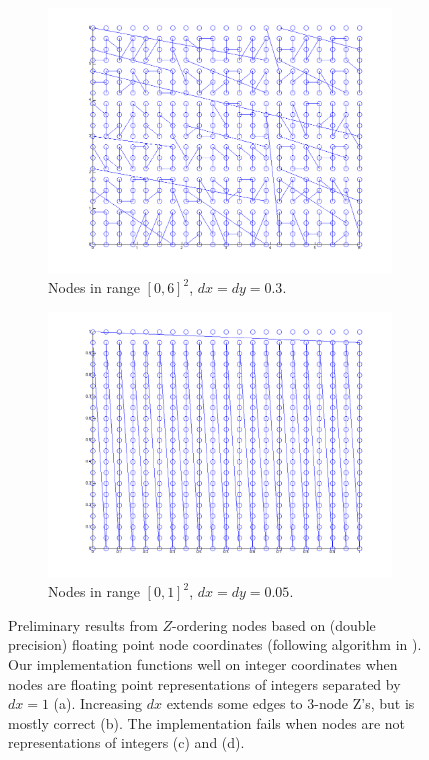 \documentclass{report}
\begin{document}
\begin{figure}
\begin{subfigure}[t]{0.5\textwidth}
\includegraphics[width=\textwidth]{stencils_content/scale3em1.png}
\caption{Nodes in range $[0,6]^2$, $dx = dy = 0.3$.  }
\label{fig:connor_fails}
\end{subfigure}
\begin{subfigure}[t]{0.5\textwidth}
\includegraphics[width=\textwidth]{stencils_content/range0_1.png}
\caption{Nodes in range $[0,1]^2$, $dx = dy = 0.05$. }
\label{fig:connor_fails2}
\end{subfigure}
\caption{Preliminary results from $Z$-ordering nodes based on  (double precision) floating point node coordinates (following algorithm in \cite{Connor2009}). Our implementation functions well on integer coordinates when nodes are floating point representations of integers separated by $dx = 1$ (a). Increasing $dx$ extends some edges to 3-node Z's, but is mostly correct (b). The implementation fails when nodes are not representations of integers (c) and (d).}
\label{fig:float_z_results}
\end{figure}


\ifstandalone


\end{document}
